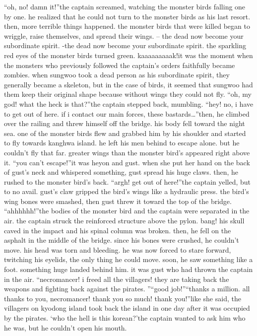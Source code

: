 “oh, no! damn it!”the captain screamed, watching the monster birds falling one by one.
he realized that he could not turn to the monster birds as his last resort.
then, more terrible things happened.
 the monster birds that were killed began to wriggle, raise themselves, and spread their wings.
– the dead now become your subordinate spirit.
-the dead now become your subordinate spirit.
the sparkling red eyes of the monster birds turned green.
kaaaaaaaaak!it was the moment when the monsters who previously followed the captain’s orders faithfully became zombies.
when sungwoo took a dead person as his subordinate spirit, they generally became a skeleton, but in the case of birds, it seemed that sungwoo had them keep their original shape because without wings they could not fly.
“oh, my god! what the heck is that?”the captain stepped back, mumbling.
“hey! no, i have to get out of here.
 if i contact our main forces, these bastards…”then, he climbed over the railing and threw himself off the bridge.
 his body fell toward the night sea.
one of the monster birds flew and grabbed him by his shoulder and started to fly towards kanghwa island.
 he left his men behind to escape alone.
but he couldn’t fly that far.
 greater wings than the monster bird’s appeared right above it.
“you can’t escape!”it was heyon and gust.
 when she put her hand on the back of gust’s neck and whispered something, gust spread his huge claws.
 then, he rushed to the monster bird’s back.
“argh! get out of here!”the captain yelled, but to no avail.
 gust’s claw gripped the bird’s wings like a hydraulic press.
 the bird’s wing bones were smashed, then gust threw it toward the top of the bridge.
“ahhhhhh!”the bodies of the monster bird and the captain were separated in the air.
 the captain struck the reinforced structure above the pylon.
bang!
his skull caved in the impact and his spinal column was broken.
 then, he fell on the asphalt in the middle of the bridge.
since his bones were crushed, he couldn’t move.
 his head was torn and bleeding.
he was now forced to stare forward, twitching his eyelids, the only thing he could move.
 soon, he saw something like a foot.
something huge landed behind him.
 it was gust who had thrown the captain in the air.
“necromancer! i freed all the villagers! they are taking back the weapons and fighting back against the pirates.
”“good job!”“thanks a million.
 all thanks to you, necromancer! thank you so much! thank you!”like she said, the villagers on kyodong island took back the island in one day after it was occupied by the pirates.
‘who the hell is this korean?’the captain wanted to ask him who he was, but he couldn’t open his mouth.
